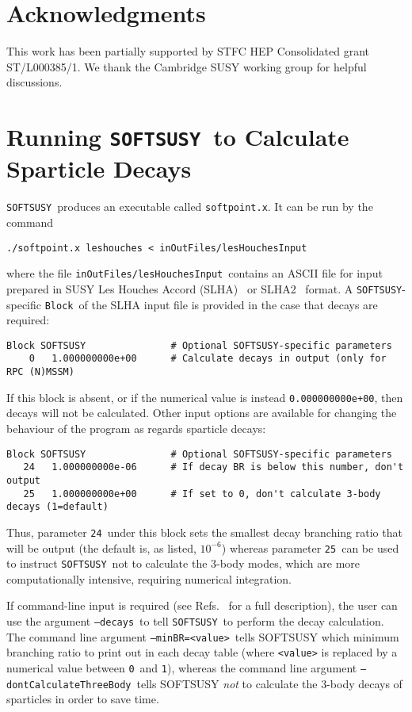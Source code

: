 \documentclass[final,3p,times,pdflatex]{elsarticle}
\def\SOFTSUSY{{\tt SOFTSUSY}}
\def\code#1{{\tt #1}}
\begin{document}
\section*{Acknowledgments}
This work has been partially supported by STFC HEP Consolidated grant 
ST/L000385/1. We thank the Cambridge SUSY working group for helpful
discussions. 

\appendix

\section{Running \SOFTSUSY~to Calculate Sparticle Decays  
\label{sec:run}}

\SOFTSUSY~produces an executable called \code{softpoint.x}. It can be run by
the command
\begin{verbatim}
./softpoint.x leshouches < inOutFiles/lesHouchesInput
\end{verbatim}
where the file \code{inOutFiles/lesHouchesInput}~contains an ASCII file
for input
prepared in SUSY Les Houches Accord (SLHA)~\cite{Skands:2003cj} or
SLHA2~\cite{Allanach:2008qq} format. 
A \code{SOFTSUSY}-specific \code{Block}~of the SLHA input file is provided in
the case that decays are required:
\begin{verbatim}
Block SOFTSUSY               # Optional SOFTSUSY-specific parameters
    0   1.000000000e+00      # Calculate decays in output (only for RPC (N)MSSM)
\end{verbatim}
If this block is absent, or if the numerical value is instead
\code{0.000000000e+00}, then decays will not be calculated. 
Other input options are available for changing the behaviour of the program as
regards sparticle decays:
\begin{verbatim}
Block SOFTSUSY               # Optional SOFTSUSY-specific parameters
   24   1.000000000e-06      # If decay BR is below this number, don't output
   25   1.000000000e+00	     # If set to 0, don't calculate 3-body decays (1=default)
\end{verbatim}
Thus, parameter \code{24}~under this block sets the smallest decay branching
ratio that will be output (the default is, as listed, $10^{-6}$) whereas 
parameter \code{25}~can be used to instruct \code{SOFTSUSY}~not to calculate
the 3-body modes, which are more computationally intensive, requiring
numerical integration. 

If command-line input is required (see
Refs.~\cite{Allanach:2001kg,Allanach:2013kza} 
for a full description), the user can use the argument 
\code{--decays}~to tell \SOFTSUSY~to perform the decay calculation. 
The command line argument \code{--minBR=<value>}~tells SOFTSUSY which minimum
branching ratio to print out in each decay table (where \code{<value>} is
replaced by a numerical value between \code{0}~and \code{1}), whereas the
command line argument \code{--dontCalculateThreeBody}~tells SOFTSUSY {\em
  not}\/ to calculate the 3-body decays of sparticles in order to save time. 
\end{document}
